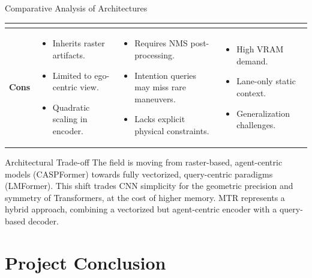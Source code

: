 \documentclass[10pt,aspectratio=169]{beamer}
\newcommand{\redominus}{\textcolor{myred}{\ding{55}}}
\begin{document}
\begin{frame}{Comparative Analysis of Architectures}
\begin{table}
\begin{tabular}{|p{1.9cm}|p{3.9cm}|p{3.9cm}|p{3.9cm}|}
\begin{itemize}
        \end{itemize} \\
        \hline
        \textbf{Cons} \redominus &
        \begin{itemize}
            \item Inherits raster artifacts.
            \item Limited to ego-centric view.
            \item Quadratic scaling in encoder.
        \end{itemize} &
        \begin{itemize}
            \item Requires NMS post-processing.
            \item Intention queries may miss rare maneuvers.
            \item Lacks explicit physical constraints.
        \end{itemize} &
        \begin{itemize}
            \item High VRAM demand.
            \item Lane-only static context.
            \item Generalization challenges.
        \end{itemize} \\
        \hline
    \end{tabular}
    \end{table}
    \begin{alertblock}{Architectural Trade-off}
        The field is moving from raster-based, agent-centric models (CASPFormer) towards fully vectorized, query-centric paradigms (LMFormer). This shift trades CNN simplicity for the geometric precision and symmetry of Transformers, at the cost of higher memory. MTR represents a hybrid approach, combining a vectorized but agent-centric encoder with a query-based decoder.
    \end{alertblock}
\end{frame}


\section{Project Conclusion}
\end{document}
